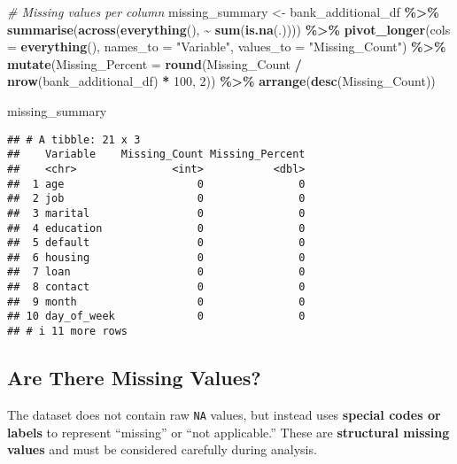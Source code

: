 \documentclass[
]{article}
\newenvironment{Shaded}{\begin{snugshade}}{\end{snugshade}}
\newcommand{\AttributeTok}[1]{\textcolor[rgb]{0.13,0.29,0.53}{#1}}
\newcommand{\CommentTok}[1]{\textcolor[rgb]{0.56,0.35,0.01}{\textit{#1}}}
\newcommand{\DecValTok}[1]{\textcolor[rgb]{0.00,0.00,0.81}{#1}}
\newcommand{\FunctionTok}[1]{\textcolor[rgb]{0.13,0.29,0.53}{\textbf{#1}}}
\newcommand{\NormalTok}[1]{#1}
\newcommand{\OtherTok}[1]{\textcolor[rgb]{0.56,0.35,0.01}{#1}}
\newcommand{\SpecialCharTok}[1]{\textcolor[rgb]{0.81,0.36,0.00}{\textbf{#1}}}
\newcommand{\StringTok}[1]{\textcolor[rgb]{0.31,0.60,0.02}{#1}}
\begin{document}
\begin{Shaded}
\begin{Highlighting}[]
\CommentTok{\# Missing values per column}
\NormalTok{missing\_summary }\OtherTok{\textless{}{-}}\NormalTok{ bank\_additional\_df }\SpecialCharTok{\%\textgreater{}\%}
  \FunctionTok{summarise}\NormalTok{(}\FunctionTok{across}\NormalTok{(}\FunctionTok{everything}\NormalTok{(), }\SpecialCharTok{\textasciitilde{}} \FunctionTok{sum}\NormalTok{(}\FunctionTok{is.na}\NormalTok{(.)))) }\SpecialCharTok{\%\textgreater{}\%}
  \FunctionTok{pivot\_longer}\NormalTok{(}\AttributeTok{cols =} \FunctionTok{everything}\NormalTok{(), }\AttributeTok{names\_to =} \StringTok{"Variable"}\NormalTok{, }\AttributeTok{values\_to =} \StringTok{"Missing\_Count"}\NormalTok{) }\SpecialCharTok{\%\textgreater{}\%}
  \FunctionTok{mutate}\NormalTok{(}\AttributeTok{Missing\_Percent =} \FunctionTok{round}\NormalTok{(Missing\_Count }\SpecialCharTok{/} \FunctionTok{nrow}\NormalTok{(bank\_additional\_df) }\SpecialCharTok{*} \DecValTok{100}\NormalTok{, }\DecValTok{2}\NormalTok{)) }\SpecialCharTok{\%\textgreater{}\%}
  \FunctionTok{arrange}\NormalTok{(}\FunctionTok{desc}\NormalTok{(Missing\_Count))}

\NormalTok{missing\_summary}
\end{Highlighting}
\end{Shaded}

\begin{verbatim}
## # A tibble: 21 x 3
##    Variable    Missing_Count Missing_Percent
##    <chr>               <int>           <dbl>
##  1 age                     0               0
##  2 job                     0               0
##  3 marital                 0               0
##  4 education               0               0
##  5 default                 0               0
##  6 housing                 0               0
##  7 loan                    0               0
##  8 contact                 0               0
##  9 month                   0               0
## 10 day_of_week             0               0
## # i 11 more rows
\end{verbatim}

\subsection{Are There Missing Values?}\label{are-there-missing-values}

The dataset does not contain raw \texttt{NA} values, but instead uses
\textbf{special codes or labels} to represent ``missing'' or ``not
applicable.'' These are \textbf{structural missing values} and must be
considered carefully during analysis.
\end{document}
